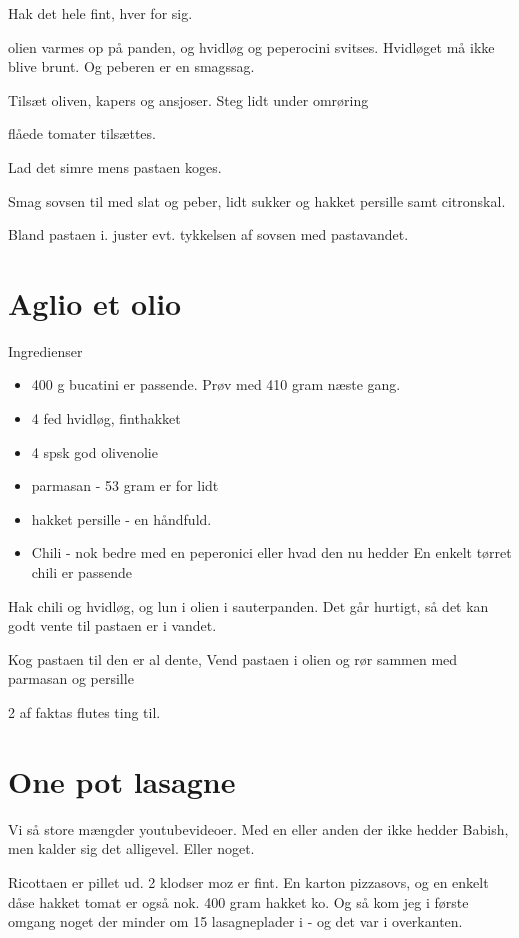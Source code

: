 \documentclass[
]{book}
\providecommand{\tightlist}{%
  \setlength{\itemsep}{0pt}\setlength{\parskip}{0pt}}
\begin{document}
Hak det hele fint, hver for sig.

olien varmes op på panden, og hvidløg og peperocini svitses. Hvidløget må ikke blive brunt. Og peberen er en smagssag.

Tilsæt oliven, kapers og ansjoser. Steg lidt under omrøring

flåede tomater tilsættes.

Lad det simre mens pastaen koges.

Smag sovsen til med slat og peber, lidt sukker og hakket persille samt citronskal.

Bland pastaen i. juster evt. tykkelsen af sovsen med pastavandet.

\hypertarget{aglio-et-olio}{%
\section{Aglio et olio}\label{aglio-et-olio}}

Ingredienser

\begin{itemize}
\tightlist
\item
  400 g bucatini er passende. Prøv med 410 gram næste gang.
\item
  4 fed hvidløg, finthakket
\item
  4 spsk god olivenolie
\item
  parmasan - 53 gram er for lidt
\item
  hakket persille - en håndfuld.
\item
  Chili - nok bedre med en peperonici eller hvad den nu hedder En enkelt tørret chili er passende
\end{itemize}

Hak chili og hvidløg, og lun i olien i sauterpanden. Det går hurtigt, så det kan godt vente til pastaen er i vandet.

Kog pastaen til den er al dente,
Vend pastaen i olien og rør sammen med parmasan og persille

2 af faktas flutes ting til.

\hypertarget{one-pot-lasagne}{%
\section{One pot lasagne}\label{one-pot-lasagne}}

Vi så store mængder youtubevideoer. Med en eller anden der ikke hedder Babish, men kalder sig det alligevel. Eller noget.

Ricottaen er pillet ud. 2 klodser moz er fint. En karton pizzasovs, og en enkelt dåse hakket tomat er også nok.
400 gram hakket ko.
Og så kom jeg i første omgang noget der minder om 15 lasagneplader i - og det var i overkanten.
\end{document}

